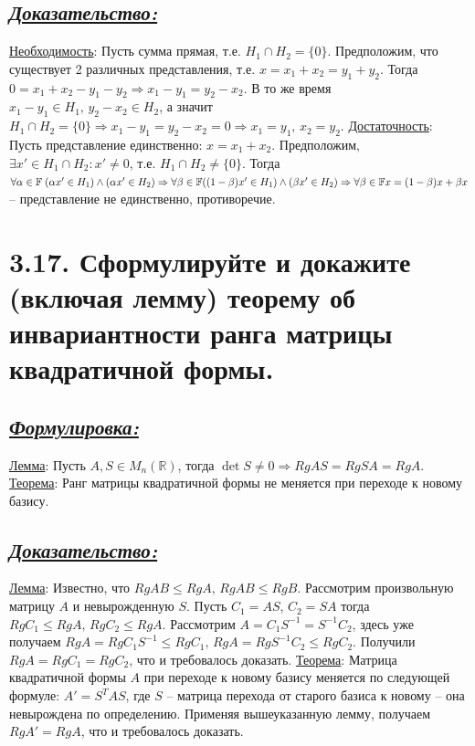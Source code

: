 \documentclass{article}
\begin{document}
\subsection*{\Large \underline{\textit{Доказательство: }}}
\underline{Необходимость}:
\newline Пусть сумма прямая, т.е. $H_1 \cap H_2 = \{0\}$. Предположим, что существует 2 различных представления, т.е. $x = x_1 + x_2 = y_1 + y_2$. Тогда $0 = x_1 + x_2 - y_1 - y_2 \Rightarrow x_1 - y_1 = y_2 - x_2$. В то же время $x_1 - y_1 \in H_1,\, y_2 - x_2 \in H_2$, а значит $H_1 \cap H_2 = \{0\} \Rightarrow x_1 - y_1 = y_2 - x_2 = 0 \Rightarrow x_1 = y_1,\, x_2 = y_2$.
\newline \underline{Достаточность}:
\newline Пусть представление единственно: $x = x_1 + x_2$. Предположим, $\exists x' \in H_1 \cap H_2 : x' \ne 0$, т.е. $H_1 \cap H_2 \ne \{0\}$. Тогда $\forall \alpha \in \mathbb{F} \; (\alpha x' \in H_1) \wedge (\alpha x' \in H_2) \Rightarrow \forall \beta \in \mathbb{F} \newline ((1 - \beta) x' \in H_1) \wedge (\beta x' \in H_2) \Rightarrow \forall \beta \in \mathbb{F} x = (1 - \beta)x + \beta x$ -- представление не единственно, противоречие.

\section*{\LARGE 3.17. Сформулируйте и докажите (включая лемму) теорему об инвариантности ранга матрицы квадратичной формы.  }
\subsection*{\Large \underline{\textit{Формулировка: }}}
\underline{Лемма}: Пусть $A, S \in M_n(\mathbb{R})$, тогда $\det{S} \ne 0 \Rightarrow RgAS = RgSA = RgA$.
\newline \underline{Теорема}: Ранг матрицы квадратичной формы не меняется при переходе к новому базису.

\subsection*{\Large \underline{\textit{Доказательство: }}}
\underline{Лемма}: Известно, что $RgAB \le RgA,\, RgAB \le RgB$. Рассмотрим произвольную матрицу $A$ и невырожденную $S$. Пусть $C_1 = AS$, $C_2 = SA$ тогда 
\newline $RgC_1 \le RgA,\, RgC_2 \le RgA$. Рассмотрим $A = C_1S^{-1} = S^{-1}C_2$, здесь уже получаем $RgA = RgC_1S^{-1} \le RgC_1,\, RgA = RgS^{-1}C_2 \le RgC_2$. Получили $RgA = RgC_1 = RgC_2$, что и требовалось доказать.
\newline \underline{Теорема}: Матрица квадратичной формы $A$ при переходе к новому базису меняется по следующей формуле: $A' = S^T A S$, где $S$ -- матрица перехода от старого базиса к новому -- она невырождена по определению. Применяя вышеуказанную лемму, получаем $RgA' = RgA$, что и требовалось доказать.
\end{document}
